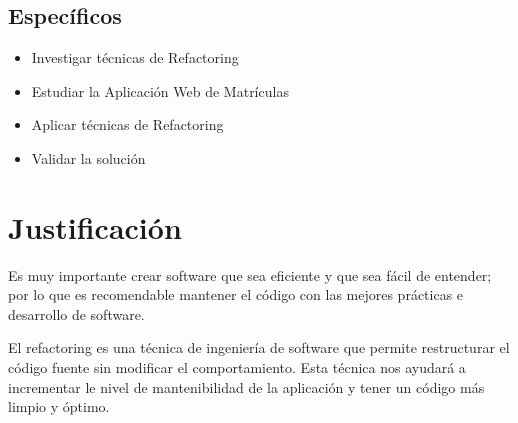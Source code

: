 \subsection{Específicos}
\begin{itemize}
    \item Investigar técnicas de Refactoring
    \item Estudiar la Aplicación Web de Matrículas
    \item Aplicar técnicas de Refactoring 
    \item Validar la solución
\end{itemize}

\section{Justificación}
Es muy importante crear software que sea eficiente y que sea fácil de entender; por lo que es recomendable mantener el código con las mejores prácticas e desarrollo de software. 

El refactoring es una técnica de ingeniería de software que permite restructurar el código fuente sin modificar el comportamiento. Esta técnica nos ayudará a incrementar le nivel de mantenibilidad de la aplicación y tener un código más limpio y óptimo.
